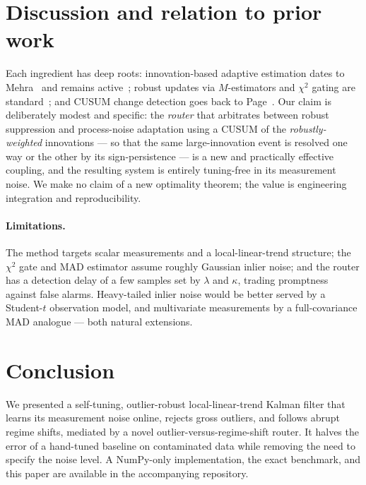 \documentclass[10pt,twocolumn]{article}
\begin{document}
\section{Discussion and relation to prior work}
\label{sec:discussion}
Each ingredient has deep roots: innovation-based adaptive estimation dates to
Mehra~\cite{mehra1970} and remains active~\cite{zhang2020}; robust updates via
$M$-estimators and $\chi^2$ gating are standard~\cite{huber1964,wang2018}; and
CUSUM change detection goes back to Page~\cite{page1954}. Our claim is
deliberately modest and specific: the \emph{router} that arbitrates between
robust suppression and process-noise adaptation using a CUSUM of the
\emph{robustly-weighted} innovations --- so that the same large-innovation event
is resolved one way or the other by its sign-persistence --- is a new and
practically effective coupling, and the resulting system is entirely tuning-free
in its measurement noise. We make no claim of a new optimality theorem; the value
is engineering integration and reproducibility.

\paragraph{Limitations.} The method targets scalar measurements and a
local-linear-trend structure; the $\chi^2$ gate and MAD estimator assume roughly
Gaussian inlier noise; and the router has a detection delay of a few samples set
by $\lambda$ and $\kappa$, trading promptness against false alarms. Heavy-tailed
inlier noise would be better served by a Student-$t$ observation model, and
multivariate measurements by a full-covariance MAD analogue --- both natural
extensions.

\section{Conclusion}
We presented a self-tuning, outlier-robust local-linear-trend Kalman filter that
learns its measurement noise online, rejects gross outliers, and follows abrupt
regime shifts, mediated by a novel outlier-versus-regime-shift router. It halves
the error of a hand-tuned baseline on contaminated data while removing the need
to specify the noise level. A NumPy-only implementation, the exact benchmark, and
this paper are available in the accompanying repository.
\end{document}
